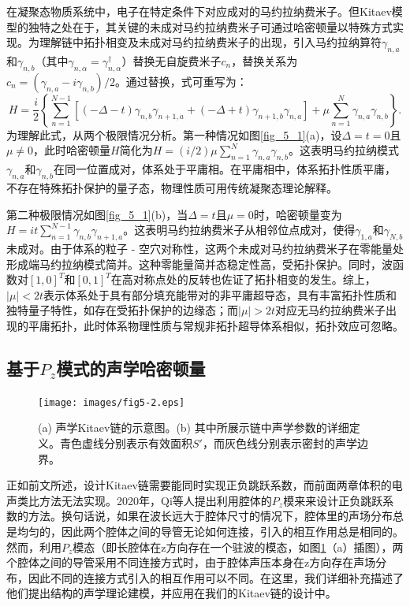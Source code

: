 在凝聚态物质系统中，电子在特定条件下对应成对的马约拉纳费米子。但Kitaev模型的独特之处在于，其关键的未成对马约拉纳费米子可通过哈密顿量以特殊方式实现。为理解链中拓扑相变及未成对马约拉纳费米子的出现，引入马约拉纳算符$\gamma_{n,a}$和$\gamma_{n,b}$（其中$\gamma_{n,\alpha} = \gamma_{n,\alpha}^{\dagger}$）替换无自旋费米子$c_{n}$，替换关系为$c_{n} = (\gamma_{n,a} - i\gamma_{n,b}) / 2$。通过替换，式可重写为：
\begin{equation}\label{eq5-4}
    H = \frac{i}{2} \left\{ \sum_{n = 1}^{N - 1} [(-\Delta - t) \gamma_{n,b} \gamma_{n + 1,a} + (-\Delta + t) \gamma_{n + 1,b} \gamma_{n,a}] + \mu \sum_{n = 1}^{N} \gamma_{n,a} \gamma_{n,b} \right\}.
\end{equation}
为理解此式，从两个极限情况分析。第一种情况如图\ref{fig_5_1}(a)，设$\Delta = t = 0$且$\mu \neq 0$，此时哈密顿量$H$简化为$H = (i / 2) \mu \sum_{n = 1}^{N} \gamma_{n,a} \gamma_{n,b}$。这表明马约拉纳模式$\gamma_{n,a}$和$\gamma_{n,b}$在同一位置成对，体系处于平庸相。在平庸相中，体系拓扑性质平庸，不存在特殊拓扑保护的量子态，物理性质可用传统凝聚态理论解释。

第二种极限情况如图\ref{fig_5_1}(b)，当$\Delta = t$且$\mu = 0$时，哈密顿量变为$H = it \sum_{n = 1}^{N - 1} \gamma_{n,b} \gamma_{n + 1,a}$。这表明马约拉纳费米子从相邻位点成对，使得$\gamma_{1,a}$和$\gamma_{N,b}$未成对。由于体系的粒子 - 空穴对称性，这两个未成对马约拉纳费米子在零能量处形成端马约拉纳模式简并。这种零能量简并态稳定性高，受拓扑保护。同时，波函数对$[1, 0]^T$和$[0, 1]^T$在高对称点处的反转也佐证了拓扑相变的发生。综上，$\vert \mu \vert < 2t$表示体系处于具有部分填充能带对的非平庸超导态，具有丰富拓扑性质和独特量子特性，如存在受拓扑保护的边缘态；而$\vert \mu \vert > 2t$对应无马约拉纳费米子出现的平庸拓扑，此时体系物理性质与常规非拓扑超导体系相似，拓扑效应可忽略。 

\subsection{基于$P_z$模式的声学哈密顿量}

\begin{figure}[h!]
    \centering
    \texttt{[image: images/fig5-2.eps]} 
    \caption{(a) 声学Kitaev链的示意图。(b) 其中所展示链中声学参数的详细定义。青色虚线分别表示有效面积$S'$，而灰色线分别表示密封的声学边界。}
    \label{fig_5_2}
\end{figure}

正如前文所述，设计Kitaev链需要能同时实现正负跳跃系数，而前面两章体积的电声类比方法无法实现。2020年，Qi等人提出利用腔体的$P_z$模来来设计正负跳跃系数的方法\cite{j10}。换句话说，如果在波长远大于腔体尺寸的情况下，腔体里的声场分布总是均匀的，因此两个腔体之间的导管无论如何连接，引入的相互作用总是相同的。然而，利用$P_z$模态（即长腔体在z方向存在一个驻波的模态，如图\ref{fig_5_2}（a）插图），两个腔体之间的导管采用不同连接方式时，由于腔体声压本身在z方向存在声场分布，因此不同的连接方式引入的相互作用可以不同。在这里，我们详细补充描述了他们提出结构的声学理论建模，并应用在我们的Kitaev链的设计中。

